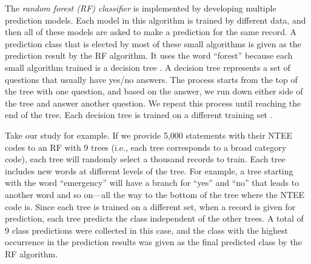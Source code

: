 \documentclass[11pt]{article}
\begin{document}
The \textit{random forest (RF) classifier} is implemented by developing multiple prediction models. Each model in this algorithm is trained by different data, and then all of these models are asked to make a prediction for the same record. A prediction class that is elected by most of these small algorithms is given as the prediction result by the RF algorithm. It uses the word ``forest'' because each small algorithm trained is a decision tree \parencites[83]{QuinlanInductiondecisiontrees1986}. A decision tree represents a set of questions that usually have yes/no answers. The process starts from the top of the tree with one question, and based on the answer, we run down either side of the tree and answer another question. We repeat this process until reaching the end of the tree. Each decision tree is trained on a different training set \parencites[124]{BreimanBaggingpredictors1996}. 

Take our study for example. If we provide 5,000 statements with their NTEE codes to an RF with 9 trees (i.e., each tree corresponds to a broad category code), each tree will randomly select a thousand records to train. Each tree includes new words at different levels of the tree. For example, a tree starting with the word ``emergency'' will have a branch for ``yes'' and ``no'' that leads to another word and so on---all the way to the bottom of the tree where the NTEE code is. Since each tree is trained on a different set, when a record is given for prediction, each tree predicts the class independent of the other trees. A total of 9 class predictions were collected in this case, and the class with the highest occurrence in the prediction results was given as the final predicted class by the RF algorithm. 

\end{document}
